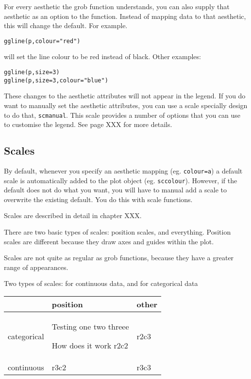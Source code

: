 For every aesthetic the grob function understands, you can also supply that aesthetic as an option to the function.  Instead of mapping data to that aesthetic, this will change the default.  For example.

\begin{alltt}
ggline(p, colour="red")  
\end{alltt}

\noindent will set the line colour to be red instead of black.  Other examples:

\begin{alltt}
ggline(p, size=3)  
ggline(p, size=3, colour="blue")  
\end{alltt}

These changes to the aesthetic attributes will not appear in the legend.  If you do want to   manually set the aesthetic attributes, you can use a scale specially design to do that, {\tt scmanual}.  This scale provides a number of options that you can use to customise the legend.  See page XXX for more details.

\subsection{Scales}\label{sub:scales}

By default, whenever you specify an aesthetic mapping (eg. {\tt colour=a}) a default scale is automatically added to the plot object (eg. {\tt sccolour}).  However, if the default does not do what you want, you will have to manual add a scale to overwrite the existing default.  You do this with scale functions.

Scales are described in detail in chapter XXX.

There are two basic types of scales: position scales, and everything.  Position scales are different because they draw axes and guides within the plot.  

Scales are not quite as regular as grob functions, because they have a greater range of appearances.  

Two types of scales: for continuous data, and for categorical data

\begin{tabular}{l|p{1in}l}
 & position & other\\
\hline
categorical & 
Testing one two threee

How does it work
r2c2 & r2c3\\
continuous & r3c2 & r3c3\\
\hline
\end{tabular}

